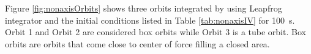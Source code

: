 Figure \ref{fig:nonaxisOrbits} shows three orbits integrated by using Leapfrog integrator and the initial conditions listed in Table \ref{tab:nonaxisIV} for \SI{100}{\s}. Orbit 1 and Orbit 2 are considered box orbits while Orbit 3 is a tube orbit. 
Box orbits are orbits that come close to center of force filling a closed area. 



\clearpage